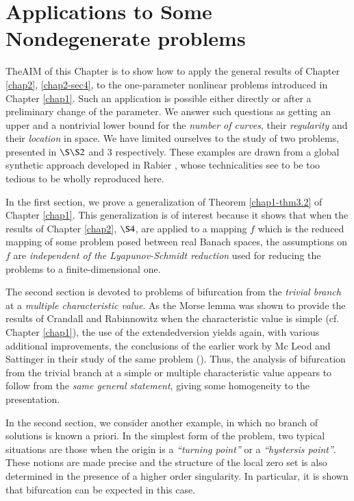 
\chapter{Applications to Some Nondegenerate problems}\label{chap3}

The\pageoriginale AIM of this Chapter is to show how to apply the general results of
Chapter \ref{chap2}, \ref{chap2-sec4}, to the one-parameter nonlinear
problems introduced in Chapter \ref{chap1}. Such an application is
possible either directly or after a preliminary change of the
parameter. We answer such questions as getting an upper and a
nontrivial lower bound for the {\em number of curves}, their {\em
  regularity} and their {\em location} in space. We have limited
ourselves to the study of two problems, presented in $\S \S 2$ and 3
respectively. These examples are drawn from a global synthetic
approach developed in Rabier \cite{31}, whose technicalities see to be too
tedious to be wholly reproduced here.

In the first section, we prove a generalization of Theorem
\ref{chap1-thm3.2} of Chapter \ref{chap1}. This generalization is of
interest because it shows that when the results of Chapter
\ref{chap2}, $\S 4$, are applied to a mapping $f$ which is the reduced
mapping of some problem posed between real Banach spaces, the
assumptions on $f$ are {\em independent of the Lyapunov-Schmidt
  reduction } used for reducing the problems to a finite-dimensional
one.

The second section is devoted to problems of bifurcation from the {\em
trivial branch} at a {\em multiple characteristic value}. As the Morse
lemma was shown to provide the results of Crandall and Rabinnowitz
when the characteristic value is simple (cf. Chapter \ref{chap1}), the
use of the extended\pageoriginale version yields again, with various
additional improvements, the conclusions of the earlier work by Mc
Leod and Sattinger in their study of the same problem (\cite{23}). Thus,
the analysis of bifurcation from the trivial branch at a simple or
multiple characteristic value appears to follow from the {\em same
  general statement}, giving some homogeneity to the presentation.

In the second section, we consider another example, in which no branch
of solutions is known a priori. In the simplest form of the problem,
two typical situations are those when the origin is a {\em ``turning
  point''} or a {\em ``hystersis point''}. These notions are made
precise and the structure of the local zero set is also determined in
the presence of a higher order singularity. In particular, it is shown
that bifurcation can be expected in this case.

